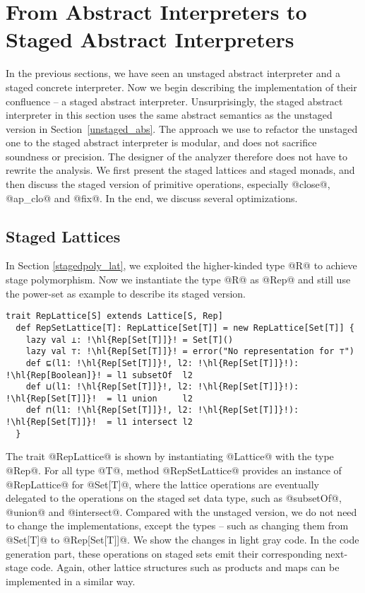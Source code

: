 \section{From Abstract Interpreters to Staged Abstract Interpreters} \label{sai}

In the previous sections, we have seen an unstaged abstract interpreter and a
staged concrete interpreter. Now we begin describing the implementation of
their confluence -- a staged abstract interpreter.  Unsurprisingly, the staged
abstract interpreter in this section uses the same abstract semantics as the
unstaged version in Section~\ref{unstaged_abs}.  The approach we use to refactor
the unstaged one to the staged abstract interpreter is modular, and does not
sacrifice soundness or precision. The designer of the analyzer therefore does not
have to rewrite the analysis. We first present the staged lattices and staged
monads, and then discuss the staged version of primitive operations, especially
@close@, @ap_clo@ and @fix@. In the end, we discuss several optimizations.

\subsection{Staged Lattices}

In Section \ref{stagedpoly_lat}, we exploited the higher-kinded type @R@ to
achieve stage polymorphism. Now we instantiate the type @R@ as @Rep@ and
still use the power-set as example to describe its staged version.
\begin{lstlisting}[escapechar=!]
  trait RepLattice[S] extends Lattice[S, Rep]
  def RepSetLattice[T]: RepLattice[Set[T]] = new RepLattice[Set[T]] {
    lazy val ⊥: !\hl{Rep[Set[T]]}! = Set[T]()
    lazy val ⊤: !\hl{Rep[Set[T]]}! = error("No representation for ⊤")
    def ⊑(l1: !\hl{Rep[Set[T]]}!, l2: !\hl{Rep[Set[T]]}!): !\hl{Rep[Boolean]}! = l1 subsetOf  l2
    def ⊔(l1: !\hl{Rep[Set[T]]}!, l2: !\hl{Rep[Set[T]]}!): !\hl{Rep[Set[T]]}!  = l1 union     l2
    def ⊓(l1: !\hl{Rep[Set[T]]}!, l2: !\hl{Rep[Set[T]]}!): !\hl{Rep[Set[T]]}!  = l1 intersect l2
  }
\end{lstlisting}

The trait @RepLattice@ is shown by instantiating @Lattice@ with the type @Rep@.
For all type @T@, method @RepSetLattice@ provides an instance of @RepLattice@
for @Set[T]@, where the lattice operations are eventually delegated to the
operations on the staged set data type, such as @subsetOf@, @union@ and
@intersect@. 
Compared with the unstaged version, we do not need to change the
implementations, except the types -- such as changing them from @Set[T]@ to
@Rep[Set[T]]@.  We show the changes in light gray code. 
In the code generation part, these operations on staged sets emit their
corresponding next-stage code. Again, other lattice structures such as products
and maps can be implemented in a similar way.

